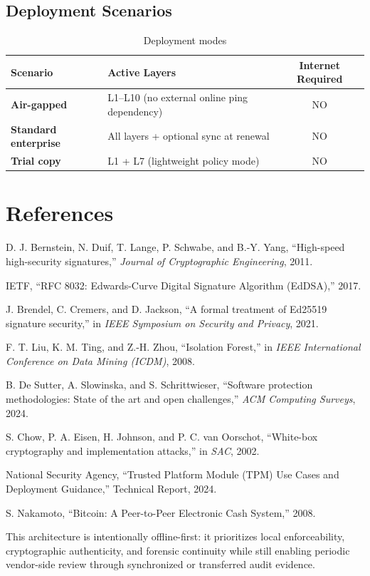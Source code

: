\documentclass[11pt,a4paper]{article}
\begin{document}
\subsection{Deployment Scenarios}
\begin{table}[H]
\centering
\caption{Deployment modes}
\begin{tabularx}{\textwidth}{>{\bfseries}lYc}
\toprule
Scenario & Active Layers & Internet Required \\
\midrule
Air-gapped & L1--L10 (no external online ping dependency) & NO \\
Standard enterprise & All layers + optional sync at renewal & NO \\
Trial copy & L1 + L7 (lightweight policy mode) & NO \\
\bottomrule
\end{tabularx}
\end{table}

\section{References}

\begin{enumerate}[label={[\arabic*]}]
\item D. J. Bernstein, N. Duif, T. Lange, P. Schwabe, and B.-Y. Yang, ``High-speed high-security signatures,'' \emph{Journal of Cryptographic Engineering}, 2011.
\item IETF, ``RFC 8032: Edwards-Curve Digital Signature Algorithm (EdDSA),'' 2017.
\item J. Brendel, C. Cremers, and D. Jackson, ``A formal treatment of Ed25519 signature security,'' in \emph{IEEE Symposium on Security and Privacy}, 2021.
\item F. T. Liu, K. M. Ting, and Z.-H. Zhou, ``Isolation Forest,'' in \emph{IEEE International Conference on Data Mining (ICDM)}, 2008.
\item B. De Sutter, A. Slowinska, and S. Schrittwieser, ``Software protection methodologies: State of the art and open challenges,'' \emph{ACM Computing Surveys}, 2024.
\item S. Chow, P. A. Eisen, H. Johnson, and P. C. van Oorschot, ``White-box cryptography and implementation attacks,'' in \emph{SAC}, 2002.
\item National Security Agency, ``Trusted Platform Module (TPM) Use Cases and Deployment Guidance,'' Technical Report, 2024.
\item S. Nakamoto, ``Bitcoin: A Peer-to-Peer Electronic Cash System,'' 2008.
\end{enumerate}

\begin{tcolorbox}[certicallout,title=\textbf{Final Note}]
This architecture is intentionally offline-first: it prioritizes local enforceability, cryptographic authenticity, and forensic continuity while still enabling periodic vendor-side review through synchronized or transferred audit evidence.
\end{tcolorbox}
\end{document}
